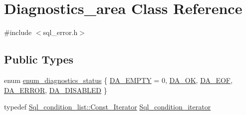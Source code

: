 \hypertarget{classDiagnostics__area}{}\section{Diagnostics\+\_\+area Class Reference}
\label{classDiagnostics__area}


{\ttfamily \#include $<$sql\+\_\+error.\+h$>$}

\subsection*{Public Types}
\begin{DoxyCompactItemize}
\item 
enum \mbox{\hyperlink{classDiagnostics__area_a841a3c3b3036d95e150bbea3e2c4f131}{enum\+\_\+diagnostics\+\_\+status}} \{ \newline
\mbox{\hyperlink{classDiagnostics__area_a841a3c3b3036d95e150bbea3e2c4f131a51ec0feac180616bb01f59dca5868b22}{D\+A\+\_\+\+E\+M\+P\+TY}} = 0, 
\mbox{\hyperlink{classDiagnostics__area_a841a3c3b3036d95e150bbea3e2c4f131a3eacb4863806fb111ed5c7850d994812}{D\+A\+\_\+\+OK}}, 
\mbox{\hyperlink{classDiagnostics__area_a841a3c3b3036d95e150bbea3e2c4f131af68a233e4d673c41e756627618653633}{D\+A\+\_\+\+E\+OF}}, 
\mbox{\hyperlink{classDiagnostics__area_a841a3c3b3036d95e150bbea3e2c4f131a74fcc13ebdfed9fdcd0662b70f515c79}{D\+A\+\_\+\+E\+R\+R\+OR}}, 
\newline
\mbox{\hyperlink{classDiagnostics__area_a841a3c3b3036d95e150bbea3e2c4f131aefb51825f2df51a6bf2532f75b0c1ebe}{D\+A\+\_\+\+D\+I\+S\+A\+B\+L\+ED}}
 \}
\item 
typedef \mbox{\hyperlink{classI__P__List__iterator}{Sql\+\_\+condition\+\_\+list\+::\+Const\+\_\+\+Iterator}} \mbox{\hyperlink{classDiagnostics__area_a5302a0cdb7499883092d87a5b901b39d}{Sql\+\_\+condition\+\_\+iterator}}
\end{DoxyCompactItemize}
